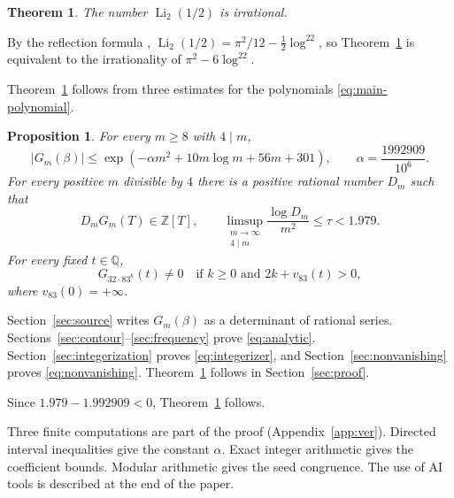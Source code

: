 \documentclass{amsart}
\newtheorem{theorem}{Theorem}
\newtheorem{proposition}[lemma]{Proposition}
\numberwithin{equation}{section}
\numberwithin{table}{section}
\begin{document}
\begin{theorem}\label{thm:main}
The number $\operatorname{Li}_2(1/2)$ is irrational.
\end{theorem}

By the reflection formula \cite[\S25.12]{DLMF},
$\operatorname{Li}_2(1/2)=\pi^2/12-\frac12\log^22$, so Theorem~\ref{thm:main} is
equivalent to the irrationality of $\pi^2-6\log^22$.

Theorem~\ref{thm:main} follows from three estimates for the polynomials
\eqref{eq:main-polynomial}.

\begin{proposition}\label{prop:main}
For every $m\ge8$ with $4\mid m$,
\begin{equation}\label{eq:analytic}
 |G_m(\beta)|\le
 \exp\left(-\alpha m^2+10m\log m+56m+301\right),
 \qquad \alpha=\frac{1992909}{10^6}.
\end{equation}
For every positive $m$ divisible by $4$ there is a positive rational number
 $D_m$ such that
\begin{equation}\label{eq:integerizer}
 D_mG_m(T)\in\mathbb Z[T],\qquad
 \limsup_{\substack{m\to\infty\\4\mid m}}\frac{\log D_m}{m^2}
 \le \tau<1.979.
\end{equation}
For every fixed $t\in\mathbb Q$,
\begin{equation}\label{eq:nonvanishing}
 G_{32\cdot83^k}(t)\ne0
 \quad\text{if }k\ge0\text{ and }2k+v_{83}(t)>0,
\end{equation}
where $v_{83}(0)=+\infty$.
\end{proposition}

Section~\ref{sec:source} writes $G_m(\beta)$ as a determinant of rational
series. Sections~\ref{sec:contour}--\ref{sec:frequency} prove
\eqref{eq:analytic}. Section~\ref{sec:integerization} proves
\eqref{eq:integerizer}, and Section~\ref{sec:nonvanishing} proves
\eqref{eq:nonvanishing}. Theorem~\ref{thm:main} follows in
Section~\ref{sec:proof}.

Since $1.979-1.992909<0$, Theorem~\ref{thm:main} follows.

Three finite computations are part of the proof (Appendix~\ref{app:ver}).
Directed interval inequalities give the constant $\alpha$. Exact integer
arithmetic gives the coefficient bounds. Modular arithmetic gives the seed
congruence. The use of AI tools is described at the end of the paper.









\end{document}
